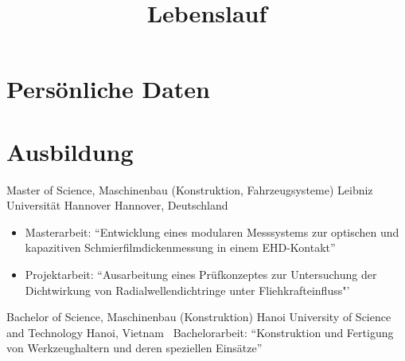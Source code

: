 \documentclass[11pt,a4paper,sans]{moderncv}
\title{Lebenslauf}
\begin{document}

\makecvtitle %


\section{\textbf{Persönliche Daten}}


\section{\textbf{Ausbildung}}

{Master of Science, Maschinenbau (Konstruktion, Fahrzeugsysteme)}
{Leibniz Universität Hannover}
{Hannover, Deutschland}
{}
{
    \begin{itemize}
        \item Masterarbeit: ``Entwicklung eines modularen Messsystems zur optischen und kapazitiven Schmierfilmdicken\-messung in einem EHD-Kontakt''
        \item Projektarbeit: ``Ausarbeitung eines Prüfkonzeptes zur Untersuchung der Dichtwirkung von Radialwellendichtringe unter Fliehkrafteinfluss"'
    \end{itemize}
}

{Bachelor of Science, Maschinenbau (Konstruktion)}
{Hanoi University of Science and Technology}
{Hanoi, Vietnam}
{}
{
    \ Bachelorarbeit: ``Konstruktion und Fertigung von Werkzeughaltern und deren speziellen Einsätze''
}


\end{document}
